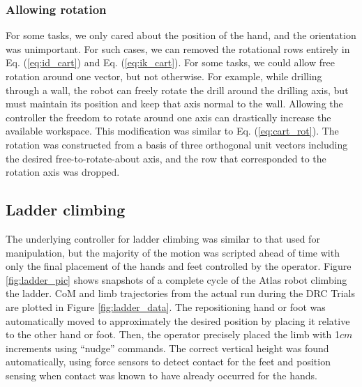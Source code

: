 \documentclass{ws-ijhr}
\newcommand{\eref}[1] {Eq. (\ref{#1})}
\newcommand{\fref}[1] {Figure \ref{#1}}
\begin{document}
\subsubsection{Allowing rotation}
For some tasks, we only cared about the position of the hand, and the 
orientation was unimportant. 
For such cases, we can removed the rotational rows entirely 
in \eref{eq:id_cart} and \eref{eq:ik_cart}. 
For some tasks, we could allow free rotation around one vector, but not 
otherwise. 
For example, while drilling through a wall, the robot can freely rotate the 
drill around the drilling axis, but must maintain its position and keep that 
axis normal to the wall. 
Allowing the controller the freedom to rotate around one axis can drastically 
increase the available workspace. 
This modification was similar to \eref{eq:cart_rot}. 
The rotation was constructed from a basis of three orthogonal unit vectors including 
the desired free-to-rotate-about axis, and the row that corresponded to the 
rotation axis was dropped. 

\subsection{Ladder climbing}
The underlying controller for ladder climbing was similar to that used for 
manipulation, but the majority of the motion was scripted ahead of time with 
only the final placement of the hands and feet controlled by the operator. 
\fref{fig:ladder_pic} shows snapshots of a complete cycle of the Atlas robot
climbing the ladder. 
CoM and limb trajectories from the actual run during the DRC Trials are 
plotted in \fref{fig:ladder_data}. 
The repositioning hand or foot was automatically moved to approximately 
the desired position by placing it relative to the other hand or foot. 
Then, the operator precisely placed the limb with 1$cm$ increments using 
``nudge'' commands. 
The correct vertical height was found automatically, using force sensors to 
detect contact for the feet and position sensing when contact was
known to have already occurred for the hands.
\end{document}
